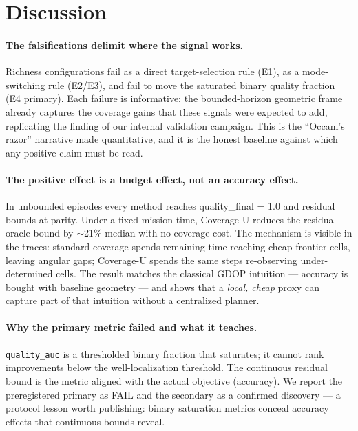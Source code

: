 \documentclass[journal]{IEEEtran}
\newcommand{\CU}{Coverage-U}
\begin{document}
\section{Discussion}
\paragraph{The falsifications delimit where the signal works.}
Richness configurations fail as a direct target-selection rule (E1), as a
mode-switching rule (E2/E3), and fail to move the saturated binary quality
fraction (E4 primary). Each failure is informative: the bounded-horizon
geometric frame already captures the coverage gains that these signals were
expected to add, replicating the finding of our internal validation campaign.
This is the ``Occam's razor'' narrative made quantitative, and it is the honest
baseline against which any positive claim must be read.

\paragraph{The positive effect is a budget effect, not an accuracy effect.}
In unbounded episodes every method reaches quality\_final = 1.0 and residual
bounds at parity. Under a fixed mission time, \CU{} reduces the residual oracle
bound by $\sim$21\% median with no coverage cost. The mechanism is visible in
the traces: standard coverage spends remaining time reaching cheap frontier
cells, leaving angular gaps; \CU{} spends the same steps re-observing
under-determined cells. The result matches the classical GDOP intuition
\cite{Bishop2004, Bishop2009} --- accuracy is bought with baseline geometry ---
and shows that a \emph{local, cheap} proxy can capture part of that intuition
without a centralized planner.

\paragraph{Why the primary metric failed and what it teaches.}
\texttt{quality\_auc} is a thresholded binary fraction that saturates; it
cannot rank improvements below the well-localization threshold. The continuous
residual bound is the metric aligned with the actual objective (accuracy). We
report the preregistered primary as FAIL and the secondary as a confirmed
discovery --- a protocol lesson worth publishing: binary saturation metrics
conceal accuracy effects that continuous bounds reveal.
\end{document}
